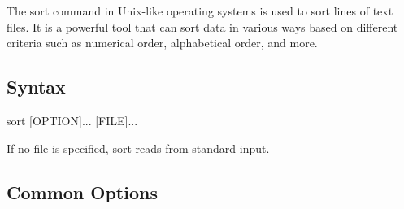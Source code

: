 \documentclass{report}
\begin{document}
    \pagebreak 
    \bigbreak \noindent 
    The sort command in Unix-like operating systems is used to sort lines of text files. It is a powerful tool that can sort data in various ways based on different criteria such as numerical order, alphabetical order, and more.
    \bigbreak \noindent 
    \subsection{Syntax}
    \bigbreak \noindent 
    \begin{bashcode}
        sort [OPTION]... [FILE]...
    \end{bashcode}
    \bigbreak \noindent 
    If no file is specified, sort reads from standard input.
    \bigbreak \noindent 
    \subsection{Common Options}
\end{document}
